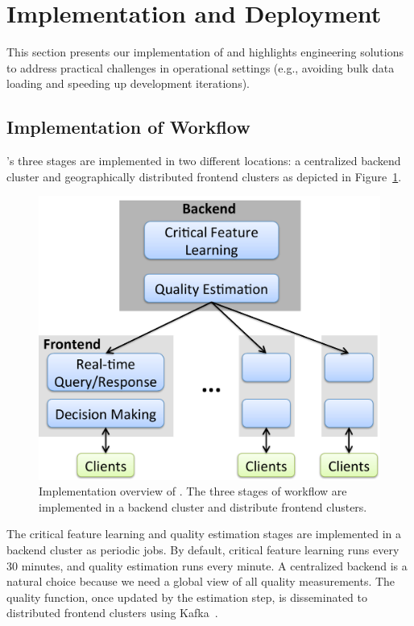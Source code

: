 \section{Implementation and Deployment}
\label{sec:cfa:impl}

This section presents our implementation of \dda 
 and highlights engineering solutions to address practical challenges 
 in operational settings (e.g., avoiding bulk data loading and 
speeding up development iterations).

\subsection{Implementation of \dda Workflow}
\label{subsec:cfa:impl:workflow}

\dda's three stages are implemented in two different locations:
a centralized backend cluster and geographically 
distributed frontend clusters as depicted in Figure~\ref{fig:impl}. 


\begin{figure}[t!]
\centering
\includegraphics[width=.55\textwidth]{figures/cfa-impl-overview.pdf}
\vspace{-0.1cm}
\caption{Implementation overview of \dda. The three stages of 
\dda workflow are implemented in a backend cluster and distribute
frontend clusters.}
\label{fig:impl}
\end{figure}

The critical feature learning and quality 
estimation stages are implemented in a backend 
cluster as periodic jobs. 
By default, critical feature learning runs every 30 
minutes, and quality estimation runs every minute. 
A centralized backend is a natural choice because 
we need  a global view of all quality measurements.
The quality function, once updated by the estimation 
step, is disseminated to distributed 
frontend clusters using Kafka~\cite{kreps2011kafka}.

